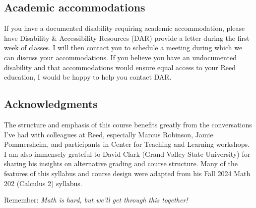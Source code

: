 \documentclass[11pt,twoside]{amsart}
\begin{document}
\subsection*{Academic accommodations}
If you have a documented disability requiring academic accommodation, please have  Disability \& Accessibility Resources (DAR)  provide a letter during the first week of classes.  I will then contact you to schedule a meeting during which we can discuss your accommodations.  If you believe you have an undocumented disability and that accommodations would ensure equal access to your Reed education, I would be happy to help you contact DAR.

\subsection*{Acknowledgments}
The structure and emphasis of this course benefits greatly from the conversations I've had with colleagues at Reed, especially Marcus Robinson, Jamie Pommersheim, and participants in Center for Teaching and Learning workshops. I am also immensely grateful to David Clark (Grand Valley State University) for sharing his insights on alternative grading and course structure. Many of the features of this syllabus and course design were adapted from his Fall 2024 Math 202 (Calculus 2) syllabus.

\bigskip \bigskip

\begin{center}
Remember: \emph{Math is hard, but we'll get through this together!}
\end{center}
\end{document}
